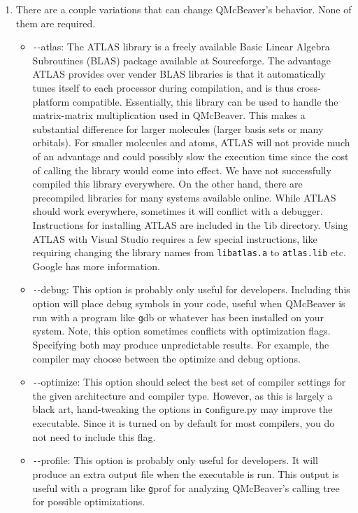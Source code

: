 \documentclass[11pt]{article}
\begin{document}
\begin{enumerate}
\item There are a couple variations that can change QMcBeaver's behavior. None of them are required.
\begin{itemize}
\item {\texttt --atlas}: The ATLAS\cite{WN147, atlas_siam} library is a freely available Basic Linear Algebra Subroutines (BLAS) package available at Sourceforge. The advantage ATLAS provides over vender BLAS libraries is that it automatically tunes itself to each processor during compilation, and is thus cross-platform compatible. Essentially, this library can be used to handle the matrix-matrix multiplication used in QMcBeaver. This makes a substantial difference for larger molecules (larger basis sets or many orbitals). For smaller molecules and atoms, ATLAS will not provide much of an advantage and could possibly slow the execution time since the cost of calling the library would come into effect.  We have not successfully compiled this library everywhere. On the other hand, there are precompiled libraries for many systems available online. While ATLAS should work everywhere, sometimes it will conflict with a debugger. Instructions for installing ATLAS are included in the {\texttt lib} directory. Using ATLAS with Visual Studio requires a few special instructions, like requiring changing the library names from \texttt{libatlas.a} to \texttt{atlas.lib} etc. Google has more information.
\item {\texttt --debug}: This option is probably only useful for developers. Including this option will place debug symbols in your code, useful when QMcBeaver is run with a program like {\texttt gdb} or whatever has been installed on your system. Note, this option sometimes conflicts with optimization flags. Specifying both may produce unpredictable results. For example, the compiler may choose between the optimize and debug options.
\item {\texttt --optimize}: This option should select the best set of compiler settings for the given architecture and compiler type. However, as this is largely a black art, hand-tweaking the options in {\texttt configure.py} may improve the executable. Since it is turned on by default for most compilers, you do not need to include this flag.
\item {\texttt --profile}: This option is probably only useful for developers. It will produce an extra output file when the executable is run. This output is useful with a program like {\texttt gprof} for analyzing QMcBeaver's calling tree for possible optimizations. 

\end{itemize}
\end{enumerate}
\end{document}
